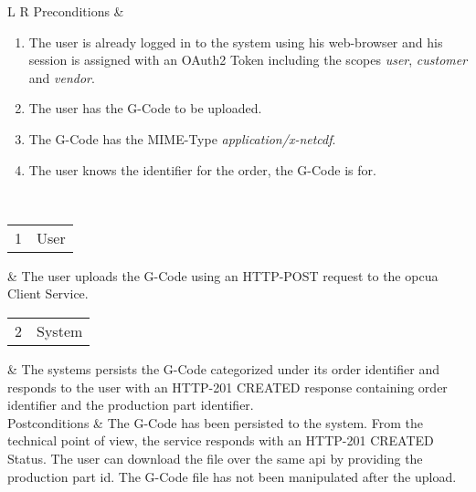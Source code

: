 \documentclass[
a4paper,
twoside,
headsepline,
cleardoublepage=empty,
parskip=half,
draft=false
]{scrbook}
\begin{document}
\begin{table}[hbtp]
\begin{tabular}{L R}
						Preconditions &
						\begin{enumerate}
							\item The user is already logged in to the system using his web-browser and his session is assigned with an OAuth2 Token including the scopes \textit{user}, \textit{customer} and \textit{vendor}.
							\item The user has the G-Code to be uploaded.
							\item The G-Code has the MIME-Type \textit{application/x-netcdf}.
							\item The user knows the identifier for the order, the G-Code is for.
						\end{enumerate}
						\\ \midrule
						\begin{tabular}{c c} 1 & User \end{tabular} & The user uploads the G-Code using an HTTP-POST request to the \gls{opcua} Client Service.
						\\ \midrule
						\begin{tabular}{c c} 2 & System \end{tabular} & The systems persists the G-Code categorized under its order identifier and responds to the user with an HTTP-201 CREATED response containing order identifier and the production part identifier.
						\\ \midrule
						Postconditions & The G-Code has been persisted to the system. From the technical point of view, the service responds with an HTTP-201 CREATED Status. The user can download the file over the same \gls{api} by providing the production part id. The G-Code file has not been manipulated after the upload.
						\\ \bottomrule
					\end{tabular}
				\end{table}
\end{document}
